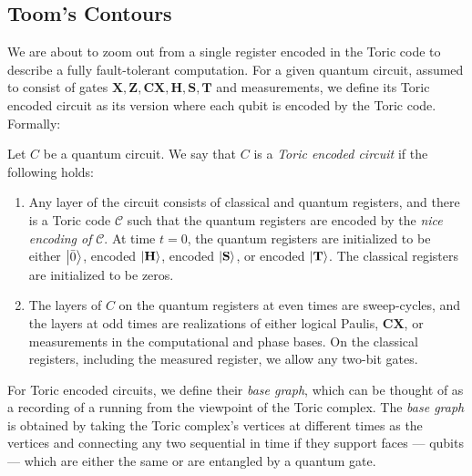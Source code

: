 




\subsection{Toom's Contours}
\label{subsection:toricencoded}
We are about to zoom out from a single register encoded in the Toric code to describe a fully fault-tolerant computation. For a given quantum circuit, assumed to consist of gates $\mathbf{X}, \mathbf{Z}, \mathbf{CX}, \mathbf{H}, \mathbf{S}, \mathbf{T}$ and measurements, we define its Toric encoded circuit as its version where each qubit is encoded by the Toric code. Formally:
    \begin{definition}
      Let $C$ be a quantum circuit. We say that $C$ is a \textit{Toric encoded circuit} if the following holds:
      \begin{enumerate}
        \item Any layer of the circuit consists of classical and quantum registers, and there is a Toric code $\mathcal{C}$ such that the quantum registers are encoded by the \textit{nice encoding of} $\mathcal{C}$. At time $t=0$, the quantum registers are initialized to be either $\ket{\bar{0}}$, encoded $\ket{\mathbf{H}}$, encoded $\ket{\mathbf{S}}$, or encoded $\ket{\mathbf{T}}$. The classical registers are initialized to be zeros.
        \item The layers of $C$ on the quantum registers at even times are sweep-cycles, and the layers at odd times are realizations of either logical Paulis, $\mathbf{CX}$, or measurements in the computational and phase bases. On the classical registers, including the measured register, we allow any two-bit gates.
        \end{enumerate} 
    \end{definition}

For Toric encoded circuits, we define their \textit{base graph}, which can be thought of as a recording of a running from the viewpoint of the Toric complex. The \textit{base graph} is obtained by taking the Toric complex's vertices at different times as the vertices and connecting any two sequential in time if they support faces — qubits — which are either the same or are entangled by a quantum gate.

